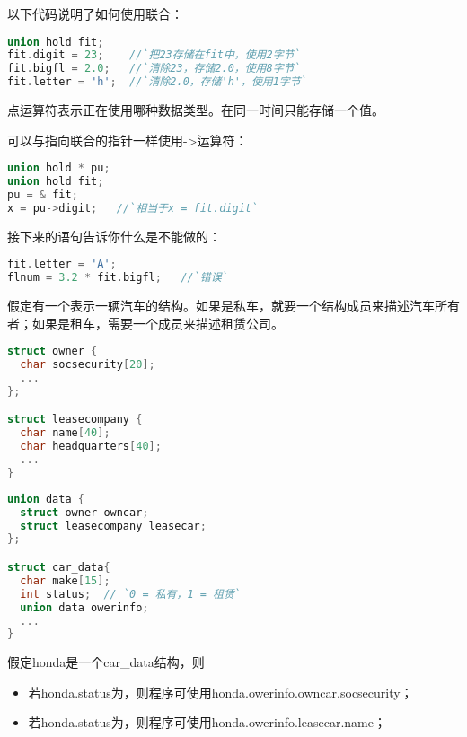 \begin{frame}[fragile]\ft{\secname}
以下代码说明了如何使用联合：
\begin{lstlisting}[language=c,backgroundcolor=\color{red!20}]
union hold fit;
fit.digit = 23;    //`把23存储在fit中，使用2字节`
fit.bigfl = 2.0;   //`清除23，存储2.0，使用8字节`
fit.letter = 'h';  //`清除2.0，存储'h'，使用1字节` 
\end{lstlisting}
点运算符表示正在使用哪种数据类型。在同一时间只能存储一个值。
\end{frame}

\begin{frame}[fragile]\ft{\secname}
可以与指向联合的指针一样使用{\tf ->}运算符：
\begin{lstlisting}[language=c,backgroundcolor=\color{red!20}]
union hold * pu;
union hold fit;
pu = & fit;
x = pu->digit;   //`相当于x = fit.digit`
\end{lstlisting}
接下来的语句告诉你什么是不能做的：
\begin{lstlisting}[language=c,backgroundcolor=\color{red!20}]
fit.letter = 'A';
flnum = 3.2 * fit.bigfl;   //`错误`
\end{lstlisting}
\end{frame}

\begin{frame}[fragile]
假定有一个表示一辆汽车的结构。如果是私车，就要一个结构成员来描述汽车所有者；如果是租车，需要一个成员来描述租赁公司。
\begin{lstlisting}[language=c,backgroundcolor=\color{red!20}]
struct owner {
  char socsecurity[20];
  ...
};

struct leasecompany {
  char name[40];
  char headquarters[40];
  ...
}
\end{lstlisting}
\end{frame}

\begin{frame}[fragile]
\begin{lstlisting}[language=c,backgroundcolor=\color{red!20}]
union data {
  struct owner owncar;
  struct leasecompany leasecar;
};

struct car_data{
  char make[15];
  int status;  // `0 = 私有，1 = 租赁` 
  union data owerinfo;
  ...
}
\end{lstlisting}

\end{frame}

\begin{frame}[fragile]
假定{\tf honda}是一个{\tf car\_data}结构，则
\begin{itemize}
\item 若{\tf honda.status}为{}，则程序可使用{\tf honda.owerinfo.owncar.socsecurity}；\\[0.1in]
\item 若{\tf honda.status}为{}，则程序可使用{\tf honda.owerinfo.leasecar.name}；\\[0.1in]
\end{itemize}
\end{frame}

